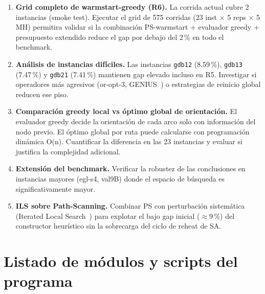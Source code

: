 \begin{enumerate}
\item \textbf{Grid completo de warmstart-greedy (R6).} La corrida
  actual cubre 2 instancias (smoke test). Ejecutar el grid de
  575 corridas (23 inst $\times$ 5 reps $\times$ 5 MH) permitira
  validar si la combinación PS-warmstart + evaluador greedy + presupuesto
  extendido reduce el gap por debajo del 2\,\% en todo el benchmark.
\item \textbf{Análisis de instancias difíciles.} Las instancias
  \texttt{gdb12} (8.59\,\%), \texttt{gdb13} (7.47\,\%) y
  \texttt{gdb21} (7.41\,\%) mantienen gap elevado incluso en R5.
  Investigar si operadores más agresivos (or-opt-3, GENIUS~\cite{gendreau1992}) o
  estrategias de reinicio global reducen ese piso.
\item \textbf{Comparación greedy local vs óptimo global de orientación.}
  El evaluador greedy decide la orientación de cada arco solo con
  información del nodo previo. El óptimo global por ruta puede
  calcularse con programación dinámica O(n). Cuantificar la diferencia
  en las 23 instancias y evaluar si justifica la complejidad adicional.
\item \textbf{Extensión del benchmark.} Verificar la robustez de las
  conclusiones en instancias mayores (egl-s4, val9B) donde el espacio
  de búsqueda es significativamente mayor.
\item \textbf{ILS sobre Path-Scanning.} Combinar PS con perturbación
  sistemática (Iterated Local Search~\cite{lourenco2003}) para explotar el bajo gap inicial
  ($\approx 9$\,\%) del constructor heurístico sin la sobrecarga del
  ciclo de reheat de SA.
\end{enumerate}

\appendix

\section{Listado de módulos y scripts del programa}

